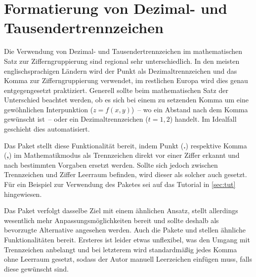 \section[%
  Das Paket \Package{mathswap} -- Dezimal- und Tausendertrennzeichen%
]{%
  Formatierung von Dezimal- und Tausendertrennzeichen%
}
%
\begin{DeclareEntity}{}
Die Verwendung von Dezimal- und Tausendertrennzeichen im mathematischen Satz 
zur Zifferngruppierung sind regional sehr unterschiedlich. In den meisten 
englischsprachigen Ländern wird der Punkt als Dezimaltrennzeichen und das Komma 
zur Zifferngruppierung verwendet, im restlichen Europa wird dies genau 
entgegengesetzt praktiziert. Generell sollte beim mathematischen Satz der 
Unterschied beachtet werden, ob es sich bei einem zu setzenden Komma um eine 
gewöhnlichen Interpunktion ($z=f(x,y)$)~-- wo ein Abstand nach dem Komma 
gewünscht ist~-- oder ein Dezimaltrennzeichen ($t=1,\!2$) handelt. Im Idealfall 
geschieht dies automatisiert.

Das Paket  stellt diese Funktionalität bereit, indem Punkt 
(\:\textbf{.}\:) respektive Komma (\:\textbf{,}\:) im Mathematikmodus als 
Trennzeichen direkt vor einer Ziffer erkannt und nach bestimmten Vorgaben 
ersetzt werden. Sollte sich jedoch zwischen Trennzeichen und Ziffer Leerraum 
befinden, wird dieser als solcher auch gesetzt. Für ein Beispiel zur Verwendung 
des Paketes sei auf das Tutorial  in \autoref{sec:tut} 
hingewiesen.

Das Paket  verfolgt dasselbe Ziel mit einem ähnlichen 
Ansatz, stellt allerdings wesentlich mehr Anpassungsmöglichkeiten bereit und 
sollte deshalb als bevorzugte Alternative angesehen werden. Auch die Pakete 
 und  stellen ähnliche Funktionalitäten 
bereit. Ersteres ist leider etwas unflexibel, was den Umgang mit Trennzeichen 
anbelangt und bei letzterem wird standardmäßig jedes Komma ohne Leerraum 
gesetzt, sodass der Autor manuell Leerzeichen einfügen muss, falls diese 
gewünscht sind. 


\end{DeclareEntity}
